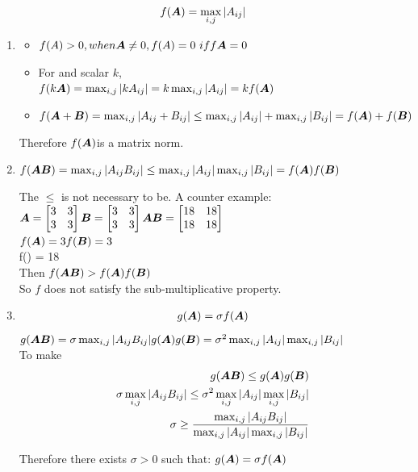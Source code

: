 \documentclass{article}
\begin{document}
\begin{align} 
f(\boldsymbol{A}) = \max_{i,j}|A_{ij}| 
\end{align} 

\begin{enumerate} 

\item 
\begin{itemize}
\item  $f(A)>0, when \mA\neq0, \\ f(A)=0\ iff \mA=0 $
\item For and scalar $k$, \\  $ f(k\boldsymbol{A}) \\= \max_{i,j}|kA_{ij}| \\= k\max_{i,j}|A_{ij}| \\=kf(\boldsymbol{A})$
\item
$f(\boldsymbol{A}+\boldsymbol{B}) \\
=\max_{i,j}|A_{ij}+B_{ij}| \\ 
\leq \max_{i,j}|A_{ij}| + \max_{i,j}|B_{ij}| \\
=f(\boldsymbol{A}) + f(\boldsymbol{B})$
\end{itemize}
Therefore $f(\boldsymbol{A})$is a matrix norm. 
\item 
$f(\boldsymbol{A}\boldsymbol{B}) \\
=\max_{i,j}|A_{ij}B_{ij}|\\ 
\leq \max_{i,j}|A_{ij}|  \max_{i,j}|B_{ij}| \\
=f(\boldsymbol{A})f(\boldsymbol{B})$

The $\leq$ is not necessary to be.  A counter example: \\
$\boldsymbol{A}= \begin{bmatrix} 3 &3\\3&3 \end{bmatrix} \\
\boldsymbol{B}= \begin{bmatrix} 3&3\\3&3 \end{bmatrix} \\ 
\boldsymbol{A}\boldsymbol{B}= \begin{bmatrix} 18&18\\18&18 \end{bmatrix} $\\
$f(\boldsymbol{A}) = 3 \\ 
f(\boldsymbol{B}) = 3 $\\
f(\mA\mB) = 18 \\
Then $ f(\boldsymbol{A}\boldsymbol{B}) > f(\boldsymbol{A})f(\boldsymbol{B})  $\\
So $f$ does not satisfy the sub-multiplicative property. 

\item 
\begin{align} 
g(\boldsymbol{A}) = \sigma f(\boldsymbol{A}) 
\end{align}
$g(\boldsymbol{A}\boldsymbol{B}) =\sigma \max_{i,j}|A_{ij}B_{ij}|\\ 
g(\boldsymbol{A})g(\boldsymbol{B}) =\sigma^2\max_{i,j}|A_{ij}|  \max_{i,j}|B_{ij}|\\$\\
To make 
\begin{align} 
g(\boldsymbol{A}\boldsymbol{B}) \leq g(\boldsymbol{A})g(\boldsymbol{B}) \\
\sigma \max_{i,j}|A_{ij}B_{ij}| \leq \sigma^2\max_{i,j}|A_{ij}|  \max_{i,j}|B_{ij}| \\
\sigma \geq\frac{\max_{i,j}|A_{ij}B_{ij}|}{\max_{i,j}|A_{ij}|  \max_{i,j}|B_{ij}|} 
\end{align}

Therefore there exists $\sigma>0$ such that: $g(\boldsymbol{A})=\sigma f(\boldsymbol{A}) $
\end{enumerate} 
\end{document}
